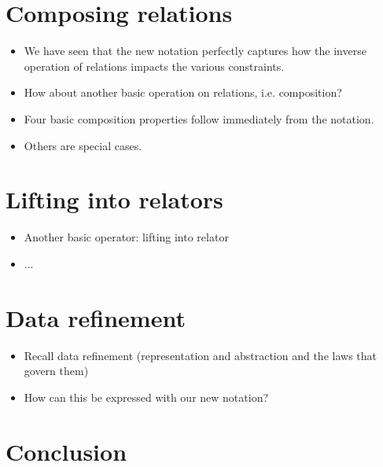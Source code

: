 \documentclass[runningheads,a4paper]{llncs}
\begin{document}
\section{Composing relations}

\begin{itemize}
\item We have seen that the new notation perfectly captures how the inverse operation of relations impacts the various constraints.
\item How about another basic operation on relations, i.e. composition?
\item Four basic composition properties follow immediately from the notation.
\item Others are special cases.
\end{itemize}

\section{Lifting into relators}

\begin{itemize}
\item Another basic operator: lifting into relator
\item ...
\end{itemize}

\section{Data refinement}

\begin{itemize}
\item Recall data refinement (representation and abstraction and the laws that govern them)
\item How can this be expressed with our new notation?
\end{itemize}

\section{Conclusion}



\end{document}

